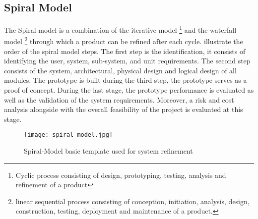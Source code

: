 \subsection{Spiral Model}
The Spiral model is a combination of the iterative model \footnote{Cyclic process consisting of design, prototyping, testing, analysis and refinement of a product} and the waterfall model \footnote{linear sequential process consisting of conception, initiation, analysis, design, construction, testing, deployment and maintenance of a product.} through which a product can be refined after each cycle.  illustrate the order of the spiral model steps. The first step is the identification, it consists of identifying the user, system, sub-system, and unit requirements. The second step consists of the system, architectural, physical design and logical design of all modules. The prototype is built during the third step, the prototype serves as a proof of concept. During the last stage, the prototype performance is evaluated as well as the validation of the system requirements. Moreover, a risk and cost analysis alongside with the overall feasibility of the project is evaluated at this stage.  
\begin{figure}[ht]
\centering
\texttt{[image: spiral\_model.jpg]}
\caption{Spiral-Model basic template used for system refinement}
\label{fig:spiral_model}
\end{figure}